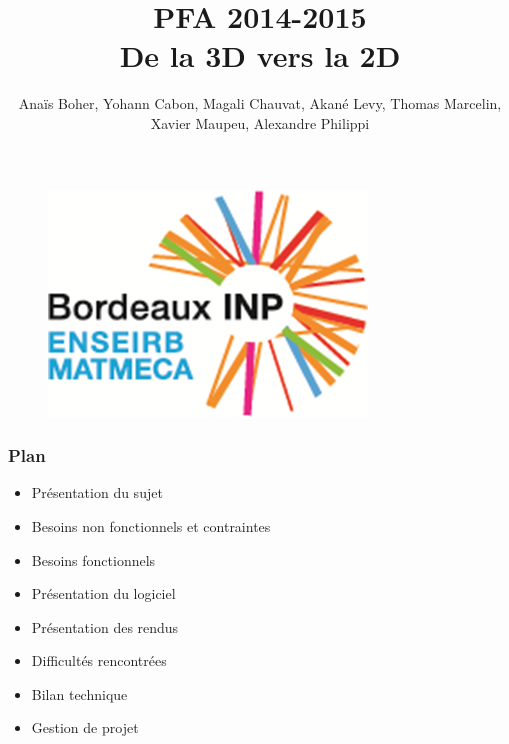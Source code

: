 \documentclass{beamer}
\title[PFA 2014-2015]{PFA 2014-2015 \\ \huge De la 3D vers la 2D} %
\author{Anaïs Boher, Yohann Cabon, Magali Chauvat, Akané Levy, Thomas Marcelin, Xavier Maupeu, Alexandre Philippi}
\institute[Enseirb-Matmeca] %
{École Nationale Supérieur d'Électronique, Informatique, Télécommunications, Mathématique et Mécanique de Bordeaux
}
\date{} %
\begin{document}
\graphicspath{{./images/}{.}}
\begin{frame}
\titlepage %
\begin{figure}[b]
\includegraphics[scale=0.4]{logo.png}
\end{figure}
\end{frame}


\begin{frame}
\frametitle{Plan}
\begin{itemize}[label=$\bullet$]
  \item Présentation du sujet
  \item Besoins non fonctionnels et contraintes
  \item Besoins fonctionnels
  \item Présentation du logiciel
  \item Présentation des rendus
  \item Difficultés rencontrées
  \item Bilan technique 
  \item Gestion de projet 
\end{itemize}
\end{frame}

\end{document}
